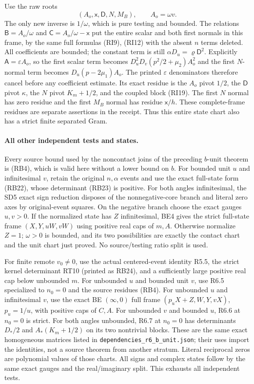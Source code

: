 Use the raw roots
\[
 (A_o,\mathsf x,\mathsf D,N,M_B),\qquad A_o=\omega v.
\]
The only new inverse is $1/\omega$, which is pure testing and
bounded. The relations $\mathsf B=A_o/\omega$ and
$\mathsf C=A_o/\omega-\mathsf x$ put the entire scalar and both
first normals in this frame, by the same full formulas (RI9),
(RI12) with the absent $n$ terms deleted. All coefficients are
bounded; the constant term is still $\alpha D_u=\varrho\mathsf D^2$.
Explicitly $\mathsf A=\varepsilon A_o$, so the first scalar term
becomes $D_u^2D_v(p^2/2+\mu_2)A_o^2$ and the first $N$-normal
term becomes $D_u(p-2\mu_1)A_o$. The printed $\varepsilon$
denominators therefore cancel before any coefficient estimate.
Its exact residue is the $A_o$ pivot $1/2$, the $\mathsf D$ pivot
$\kappa$, the $N$ pivot $K_m+1/2$, and the coupled block (RI19).
The first $N$ normal has zero residue and the first $M_B$ normal
has residue $\mathsf x/h$. These complete-frame residues are
separate assertions in the receipt. Thus this entire state chart
also has a strict finite separated Gram.

\paragraph{All other independent tests and states.}
Every source bound used by the noncontact joins of the preceding
$b$-unit theorem is (RB4), which is valid here without a lower bound
on $b$. For bounded unit $u$ and infinitesimal $v$, retain the original
$n,\alpha$ events and use the exact full-state form (RB22), whose
determinant (RB23) is positive. For both angles infinitesimal, the
SD5 exact sign reduction disposes of the nonnegative-core branch
and literal zero axes by original-event squares. On the negative
branch choose the exact gauges $u,v>0$. If the normalized state has
$Z$ infinitesimal, BE4 gives the strict full-state frame
$(X,Y,uW,vW)$ using positive real caps of $m,A$.
Otherwise normalize $Z=1$; $\omega>0$ is bounded, and its two
possibilities are exactly the contact chart and the unit chart just
proved. No source/testing ratio split is used.

For finite remote $v_0\ne0$, use the actual centered-event identity
R5.5, the strict kernel determinant RT10 (printed as RB24), and a
sufficiently large positive real cap below unbounded $m$.
For unbounded $u$ and bounded unit $v$, use R6.5 specialized to
$n_0=0$ and the source residues (RB4). For unbounded $u$ and
infinitesimal $v$, use the exact BE $(\infty,0)$ full frame
$(p_uX+Z,W,Y,vX)$, $p_u=1/u$, with positive caps of $C,A$.
For unbounded $v$ and bounded $u$, R6.6 at $n_0=0$ is strict.
For both angles unbounded, R6.7 at $n_0=0$ has determinants
$D_*/2$ and $A_*(K_m+1/2)$ on its two nontrivial blocks.
These are the same exact homogeneous matrices listed in
\texttt{dependencies\_r6\_b\_unit.json}; their uses import the
identities, not a source theorem from another stratum.
Literal reciprocal zeros are polynomial values of those charts.
All signs and complex states follow by the same exact gauges and
the real/imaginary split. This exhausts all independent tests.

